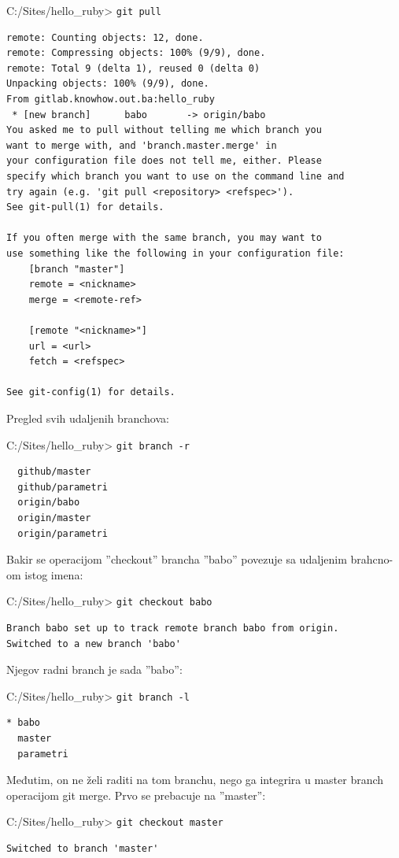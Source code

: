 \documentclass[times, utf8, seminar]{fit}
\begin{document}
C:/Sites/hello\_ruby> \texttt{git pull}
\begin{lstlisting}
remote: Counting objects: 12, done.
remote: Compressing objects: 100% (9/9), done.
remote: Total 9 (delta 1), reused 0 (delta 0)
Unpacking objects: 100% (9/9), done.
From gitlab.knowhow.out.ba:hello_ruby
 * [new branch]      babo       -> origin/babo
You asked me to pull without telling me which branch you
want to merge with, and 'branch.master.merge' in
your configuration file does not tell me, either. Please
specify which branch you want to use on the command line and
try again (e.g. 'git pull <repository> <refspec>').
See git-pull(1) for details.

If you often merge with the same branch, you may want to
use something like the following in your configuration file:
    [branch "master"]
    remote = <nickname>
    merge = <remote-ref>

    [remote "<nickname>"]
    url = <url>
    fetch = <refspec>

See git-config(1) for details.
\end{lstlisting}

Pregled svih udaljenih branchova:

C:/Sites/hello\_ruby> \texttt{git branch -r}
\begin{lstlisting}
  github/master
  github/parametri
  origin/babo
  origin/master
  origin/parametri
\end{lstlisting}

Bakir se operacijom ''checkout'' brancha ''babo'' povezuje sa udaljenim brahcno-om istog imena:

C:/Sites/hello\_ruby> \texttt{git checkout babo}
\begin{lstlisting}
Branch babo set up to track remote branch babo from origin.
Switched to a new branch 'babo'
\end{lstlisting}

Njegov radni branch je sada ''babo'':

C:/Sites/hello\_ruby> \texttt{git branch -l}
\begin{lstlisting}
* babo
  master
  parametri
\end{lstlisting}

Međutim, on ne želi raditi na tom branchu, nego ga integrira u master branch operacijom git merge. Prvo se prebacuje na ''master'':

C:/Sites/hello\_ruby> \texttt{git checkout master}
\begin{lstlisting}
Switched to branch 'master'
\end{lstlisting}
\end{document}
